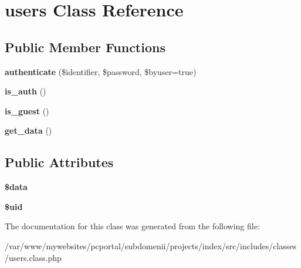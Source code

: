 \hypertarget{classusers}{
\section{\-u\-s\-e\-r\-s \-C\-l\-a\-s\-s \-R\-e\-f\-e\-r\-e\-n\-c\-e}
\label{classusers}
}
\subsection*{Public Member Functions}
\begin{DoxyCompactItemize}
\item 
\hypertarget{classusers_acd6cd27d1600576598f0858c784a765e}{
{\bfseries \-a\-u\-t\-h\-e\-n\-t\-i\-c\-a\-t\-e} \-(\$\-i\-d\-e\-n\-t\-i\-f\-i\-e\-r, \$\-p\-a\-s\-s\-w\-o\-r\-d, \$\-b\-y\-u\-s\-e\-r\-=\-t\-r\-u\-e\-)}
\label{classusers_acd6cd27d1600576598f0858c784a765e}

\item 
\hypertarget{classusers_a1213a0452e4d8b04655881cf77200b92}{
{\bfseries \-i\-s\_\-\-a\-u\-t\-h} \-(\-)}
\label{classusers_a1213a0452e4d8b04655881cf77200b92}

\item 
\hypertarget{classusers_af980174f52b4845fa3cf9a52f2cd17e4}{
{\bfseries \-i\-s\_\-\-g\-u\-e\-s\-t} \-(\-)}
\label{classusers_af980174f52b4845fa3cf9a52f2cd17e4}

\item 
\hypertarget{classusers_abad88de24327025f6e80259e1a5e5ddc}{
{\bfseries \-g\-e\-t\_\-\-d\-a\-t\-a} \-(\-)}
\label{classusers_abad88de24327025f6e80259e1a5e5ddc}

\end{DoxyCompactItemize}
\subsection*{Public Attributes}
\begin{DoxyCompactItemize}
\item 
\hypertarget{classusers_ae4b21786e9998d117fa95747b702af56}{
{\bfseries \$\-d\-a\-t\-a}}
\label{classusers_ae4b21786e9998d117fa95747b702af56}

\item 
\hypertarget{classusers_a6615961f6df219d007accc5458e30da6}{
{\bfseries \$\-u\-i\-d}}
\label{classusers_a6615961f6df219d007accc5458e30da6}

\end{DoxyCompactItemize}


The documentation for this class was generated from the following file:\begin{DoxyCompactItemize}
\item 
\-/\-v\-a\-r\-/\-w\-w\-w\-/\-m\-y\-w\-e\-b\-s\-i\-t\-e\-s\-/\-p\-c\-p\-o\-r\-t\-a\-l\-/\-s\-u\-b\-d\-o\-m\-e\-n\-i\-i\-/\-p\-r\-o\-j\-e\-c\-t\-s\-/\-i\-n\-d\-e\-x\-/\-s\-r\-c\-/\-i\-n\-c\-l\-u\-d\-e\-s\-/\-c\-l\-a\-s\-s\-e\-s\-/\-u\-s\-e\-r\-s\-.\-c\-l\-a\-s\-s\-.\-p\-h\-p\end{DoxyCompactItemize}
